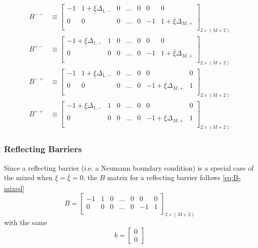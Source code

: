 \documentclass[11pt]{article}
\theoremstyle{definition}
\begin{document}
\begin{align}
B^{--} &\equiv 
\begin{bmatrix}
-1 & 1  + \underline{\xi}\Delta_{1,-} & 0 & \dots & 0 & 0 & 0 \\
0 & 0 & 0 & \dots & 0 & -1 & 1 + \overline{\xi}\Delta_{M,+}\\
\end{bmatrix}_{2 \times (M+2)} \\
B^{+-} &\equiv 
\begin{bmatrix}
-1 + \underline{\xi}\Delta_{1,-} & 1 & 0 & \dots & 0 & 0 & 0 \\
0 & 0 & 0 & \dots & 0 & -1 & 1 + \overline{\xi}\Delta_{M,+}\\
\end{bmatrix}_{2 \times (M+2)} \\
B^{-+} &\equiv 
\begin{bmatrix}
-1  & 1 + \underline{\xi}\Delta_{1,-} & 0 & \dots & 0 & 0 & 0 \\
0 & 0 & 0 & \dots & 0 & -1+ \overline{\xi}\Delta_{M,+} & 1\\
\end{bmatrix}_{2 \times (M+2)} \\
B^{++} &\equiv 
\begin{bmatrix}
-1 + \underline{\xi}\Delta_{1,-} & 1 & 0 & \dots & 0 & 0 & 0 \\
0 & 0 & 0 & \dots & 0 & -1+ \overline{\xi}\Delta_{M,+} & 1 \\
\end{bmatrix}_{2 \times (M+2)}
\end{align}


\subsubsection{Reflecting Barriers}
Since a reflecting barrier (i.e. a Neumann boundary condition) is a special case of the mixed when  $\underline{\xi} = \bar{\xi} = 0$, the $B$ matrix for a reflecting barrier follows \cref{eq:B-mixed}
\begin{equation}
B = \begin{bmatrix}
-1& 1 & 0 & \dots & 0 & 0 & 0 \\
0 & 0 & 0 & \dots & 0 & -1 & 1\\
\end{bmatrix}_{2 \times (M+2)}
\end{equation}
with the same 
\begin{equation}
	b = \begin{bmatrix}	
			0 \\
		 	0
		 	\end{bmatrix}
\end{equation}
\end{document}
